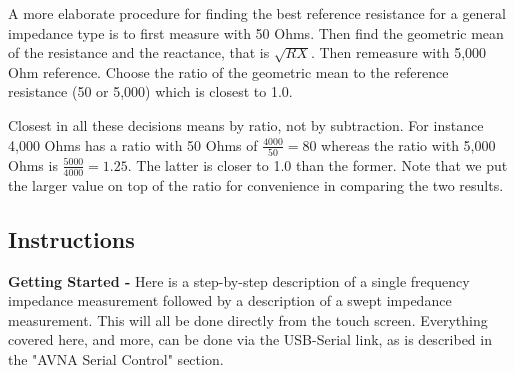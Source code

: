 A more elaborate procedure for finding the best reference resistance for a general impedance type is to first measure with 50 Ohms. Then find the geometric mean of the resistance and the reactance, that is \(\sqrt{R X}\). Then remeasure with 5,000 Ohm reference. Choose the ratio of the geometric mean to the reference resistance (50 or 5,000) which is closest to 1.0.

Closest in all these decisions means by ratio, not by subtraction. For instance 4,000 Ohms has a ratio with 50 Ohms of  \( \frac{4000}{50} = 80\) whereas the ratio with 5,000 Ohms is \( \frac{5000}{4000} = 1.25\). The latter is closer to 1.0 than the former.  Note that we put the larger value on top of the ratio for convenience in comparing the two results.
%
\subsection{Instructions}
\textbf{Getting Started - }Here is a step-by-step description of a single frequency impedance measurement followed by a description of a swept impedance measurement. This will all be done directly from the touch screen. Everything covered here, and more, can be done via the USB-Serial link, as is described in the "AVNA Serial Control" section.


